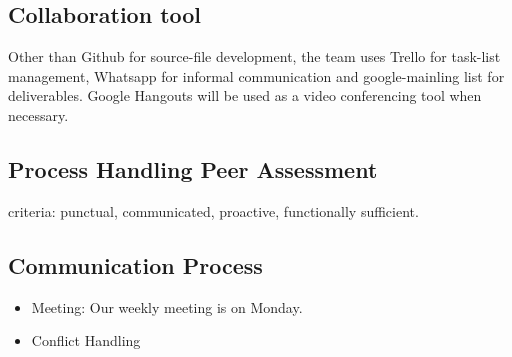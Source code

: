 \documentclass[11pt]{article}
\begin{document}
\subsection{Collaboration tool}

Other than Github for source-file development, the team uses Trello for task-list management, Whatsapp for informal communication and google-mainling list for deliverables. Google Hangouts will be used as a video conferencing tool when necessary.

\subsection{Process Handling Peer Assessment}
criteria: punctual, communicated, proactive, functionally sufficient. 
\subsection{Communication Process}
\begin{itemize}
	\item Meeting: Our weekly meeting is on Monday.
	\item Conflict Handling
\end{itemize}
\end{document}
